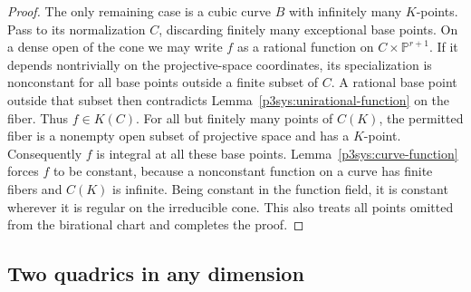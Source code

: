 \begin{proof}
The only remaining case is a cubic curve $B$ with infinitely many
$K$-points.  Pass to its normalization $C$, discarding finitely
many exceptional base points.  On a dense open of the cone we may
write $f$ as a rational function on
$C\times\mathbb P^{r+1}$.  If it depends nontrivially on the
projective-space coordinates, its specialization is nonconstant
for all base points outside a finite subset of $C$.  A rational
base point outside that subset then contradicts
Lemma~\ref{p3sys:unirational-function} on the fiber.  Thus
$f\in K(C)$.  For all but finitely many points of $C(K)$, the
permitted fiber is a nonempty open subset of projective space and
has a $K$-point.  Consequently $f$ is integral at all these base
points.  Lemma~\ref{p3sys:curve-function} forces $f$ to be
constant, because a nonconstant function on a curve has finite
fibers and $C(K)$ is infinite.  Being constant in the function
field, it is constant wherever it is regular on the irreducible
cone.  This also treats all points omitted from the birational
chart and completes the proof.
\end{proof}

\subsection{Two quadrics in any dimension}


